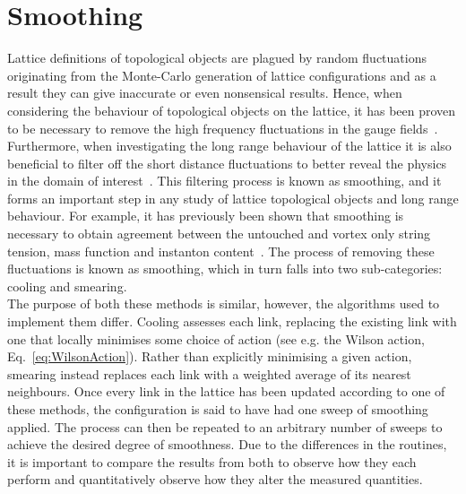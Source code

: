 
\chapter{Smoothing}\label{chapter:Smoothing}
\ifpdf
    \graphicspath{{Chapter5/Figs/Raster/}{Chapter5/Figs/PDF/}{Chapter5/Figs/}}
\else
    \graphicspath{{Chapter5/Figs/Vector/}{Chapter5/Figs/}}
\fi

Lattice definitions of topological objects are plagued by random fluctuations originating from the Monte-Carlo generation of lattice configurations and as a result they can give inaccurate or even nonsensical results. Hence, when considering the behaviour of topological objects on the lattice, it has been proven to be necessary to remove the high frequency fluctuations in the gauge fields~\cite{Bonnet:2000dc}. Furthermore, when investigating the long range behaviour of the lattice it is also beneficial to filter off the short distance fluctuations to better reveal the physics in the domain of interest~\cite{Moran:2008ra}. This filtering process is known as smoothing, and it forms an important step in any study of lattice topological objects and long range behaviour. For example, it has previously been shown that smoothing is necessary to obtain agreement between the untouched and vortex only string tension, mass function and instanton content~\cite{Trewartha:2015ida,Trewartha:2015nna,Trewartha:2017ive}. The process of removing these fluctuations is known as smoothing, which in turn falls into two sub-categories: cooling and smearing.\\

The purpose of both these methods is similar, however, the algorithms used to implement them differ. Cooling assesses each link, replacing the existing link with one that locally minimises some choice of action (see e.g. the Wilson action, Eq.~\ref{eq:WilsonAction}). Rather than explicitly minimising a given action, smearing  instead replaces each link with a weighted average of its nearest neighbours. Once every link in the lattice has been updated according to one of these methods, the configuration is said to have had one sweep of smoothing applied. The process can then be repeated to an arbitrary number of sweeps to achieve the desired degree of smoothness.  Due to the differences in the routines, it is important to compare the results from both to observe how they each perform and quantitatively observe how they alter the measured quantities.


